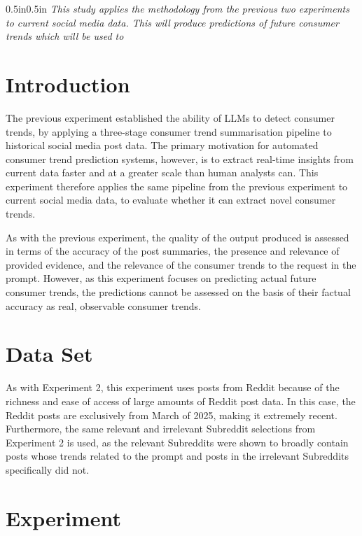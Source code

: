 \documentclass{report}
\begin{document}
\begin{adjustwidth}{0.5in}{0.5in}
\textit{This study applies the methodology from the previous two experiments to current social media data. This will produce predictions of future consumer trends which will be used to }
\end{adjustwidth}

\section{Introduction}

The previous experiment established the ability of LLMs to detect consumer trends, by applying a three-stage consumer trend summarisation pipeline to historical social media post data. The primary motivation for automated consumer trend prediction systems, however, is to extract real-time insights from current data faster and at a greater scale than human analysts can. This experiment therefore applies the same pipeline from the previous experiment to current social media data, to evaluate whether it can extract novel consumer trends.

As with the previous experiment, the quality of the output produced is assessed in terms of the accuracy of the post summaries, the presence and relevance of provided evidence, and the relevance of the consumer trends to the request in the prompt. However, as this experiment focuses on predicting actual future consumer trends, the predictions cannot be assessed on the basis of their factual accuracy as real, observable consumer trends.

\section{Data Set}

As with Experiment 2, this experiment uses posts from Reddit because of the richness and ease of access of large amounts of Reddit post data. In this case, the Reddit posts are exclusively from March of 2025, making it extremely recent. Furthermore, the same relevant and irrelevant Subreddit selections from Experiment 2 is used, as the relevant Subreddits were shown to broadly contain posts whose trends related to the prompt and posts in the irrelevant Subreddits specifically did not.

\section{Experiment}
\end{document}
